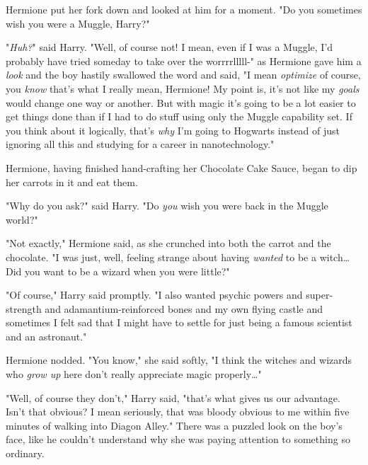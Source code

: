 Hermione put her fork down and looked at him for a moment. "Do you sometimes 
wish you were a Muggle, Harry?"

"\emph{Huh?}" said Harry. "Well, of course not! I mean, even if I was a Muggle, 
I'd probably have tried someday to take over the worrrrlllll-" as Hermione gave 
him a \emph{look} and the boy hastily swallowed the word and said, "I mean 
\emph{optimize} of course, you \emph{know} that's what I really mean, Hermione! 
My point is, it's not like my \emph{goals} would change one way or another. But 
with magic it's going to be a lot easier to get things done than if I had to do 
stuff using only the Muggle capability set. If you think about it logically, 
that's \emph{why} I'm going to Hogwarts instead of just ignoring all this and 
studying for a career in nanotechnology."

Hermione, having finished hand-crafting her Chocolate Cake Sauce, began to dip 
her carrots in it and eat them.

"Why do you ask?" said Harry. "Do \emph{you} wish you were back in the Muggle 
world?"

"Not exactly," Hermione said, as she crunched into both the carrot and the 
chocolate. "I was just, well, feeling strange about having \emph{wanted} to be 
a witch{\ldots} Did you want to be a wizard when you were little?"

"Of course," Harry said promptly. "I also wanted psychic powers and 
super-strength and adamantium-reinforced bones and my own flying castle and 
sometimes I felt sad that I might have to settle for just being a famous 
scientist and an astronaut."

Hermione nodded. "You know," she said softly, "I think the witches and wizards 
who \emph{grow up} here don't really appreciate magic properly{\ldots}"

"Well, of course they don't," Harry said, "that's what gives us our advantage. 
Isn't that obvious? I mean seriously, that was bloody obvious to me within five 
minutes of walking into Diagon Alley." There was a puzzled look on the boy's 
face, like he couldn't understand why she was paying attention to something so 
ordinary.
